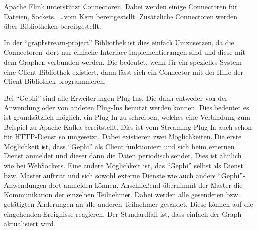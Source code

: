 Apache Flink unterstützt Connectoren. Dabei werden einige Connectoren
für Dateien, Sockets,~\dots vom Kern bereitgestellt. Zusätzliche Connectoren
werden über Bibliotheken bereitgestellt.

In der \enquote{graphstream-project} Bibliothek ist dies einfach Umzusetzen, da
die Connectoren, dort nur einfache Interface Implementierungen sind und diese
mit dem Graphen verbunden werden. Die bedeutet, wenn für ein spezielles
System eine Client-Bibliothek existiert, dann lässt sich ein Connector mit der
Hilfe der Client-Bibliothek programmieren.

Bei \enquote{Gephi} sind alle Erweiterungen Plug-Ins. Die dann entweder von der
Anwendung oder von anderen Plug-Ins benutzt werden können. Dies bedeutet es ist
grundsätzlich möglich, ein Plug-In zu schreiben, welches eine Verbindung zum
Beispiel zu Apache Kafka bereitstellt. Dies ist vom Streaming-Plug-In auch schon
für HTTP-Dienst so umgesetzt. Dabei existieren zwei Möglichkeiten. Die erste
Möglichkeit ist, dass \enquote{Gephi} als Client funktioniert und sich beim
externen Dienst anmeldet und dieser dann die Daten periodisch sendet. Dies ist
ähnlich wie bei WebSockets. Eine andere Möglichkeit ist, das \enquote{Gephi}
selbst als Dienst bzw. Master auftritt und sich sowohl externe Dienste wie auch
andere \enquote{Gephi}-Anwendungen dort anmelden können. Anschließend übernimmt
der Master die Kommunikation der einzelnen Teilnehmer. Dabei werden alle gesendeten
bzw. getätigten Änderungen an alle anderen Teilnehmer gesendet. Diese können
auf die eingehenden Ereignisse reagieren. Der Standardfall ist, dass einfach der
Graph aktualisiert wird.

